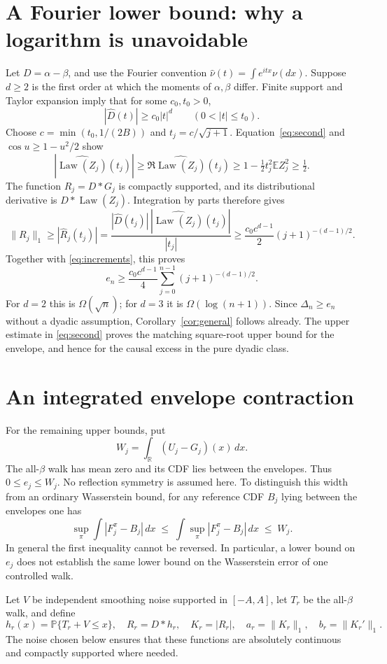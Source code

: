\documentclass[11pt,a4paper]{article}
\numberwithin{equation}{section}
\newcommand{\E}{\mathbb E}
\newcommand{\Prb}{\mathbb P}
\newcommand{\Law}{\operatorname{Law}}
\begin{document}
\section{A Fourier lower bound: why a logarithm is unavoidable}
Let $D=\alpha-\beta$, and use the Fourier convention
$\widehat\nu(t)=\int e^{itx}\nu(dx)$.
Suppose $d\ge2$ is the first order at which the moments of $\alpha,\beta$
differ. Finite support and Taylor expansion imply that for some
$c_0,t_0>0$,
\begin{equation}\label{eq:fourierD}
|\widehat D(t)|\ge c_0|t|^d\qquad(0<|t|\le t_0).
\end{equation}
Choose $c=\min(t_0,1/(2B))$ and $t_j=c/\sqrt{j+1}$.
Equation~\eqref{eq:second} and $\cos u\ge1-u^2/2$ show
\[
|\widehat{\Law(Z_j)}(t_j)|\ge
\Re\widehat{\Law(Z_j)}(t_j)
\ge1-\tfrac12t_j^2\E Z_j^2\ge\tfrac12.
\]
The function $R_j=D*G_j$ is compactly supported, and its distributional
derivative is $D*\Law(Z_j)$. Integration by parts therefore gives
\[
\|R_j\|_1\ge|\widehat R_j(t_j)|
=\frac{|\widehat D(t_j)|\,
|\widehat{\Law(Z_j)}(t_j)|}{|t_j|}
\ge\frac{c_0c^{d-1}}2(j+1)^{-(d-1)/2}.
\]
Together with \eqref{eq:increments}, this proves
\begin{equation}\label{eq:lower}
e_n\ge\frac{c_0c^{d-1}}4
\sum_{j=0}^{n-1}(j+1)^{-(d-1)/2}.
\end{equation}
For $d=2$ this is $\Omega(\sqrt n)$; for $d=3$ it is
$\Omega(\log(n+1))$. Since $\Delta_n\ge e_n$ without a dyadic
assumption, Corollary~\ref{cor:general} follows already.
The upper estimate in \eqref{eq:second} proves the matching square-root
upper bound for the envelope, and hence for the causal excess in the
pure dyadic class.

\section{An integrated envelope contraction}
For the remaining upper bounds, put
\[
W_j=\int_{\mathbb R}(U_j-G_j)(x)\,dx.
\]
The all-$\beta$ walk has mean zero and its CDF lies between the envelopes.
Thus $0\le e_j\le W_j$. No reflection symmetry is assumed here.
To distinguish this width from an ordinary Wasserstein bound, for any
reference CDF $B_j$ lying between the envelopes one has
\[
\sup_\pi\int|F_j^\pi-B_j|\,dx
\;\le\;\int\sup_\pi|F_j^\pi-B_j|\,dx
\;\le\;W_j.
\]
In general the first inequality cannot be reversed. In particular,
a lower bound on $e_j$ does not establish the same lower bound on the
Wasserstein error of one controlled walk.

Let $V$ be independent smoothing noise supported in $[-A,A]$, let $T_r$
be the all-$\beta$ walk, and define
\[
h_r(x)=\Prb\{T_r+V\le x\},\quad
R_r=D*h_r,\quad K_r=|R_r|,\quad
 a_r=\|K_r\|_1,\quad b_r=\|K_r'\|_1.
\]
The noise chosen below ensures that these functions are absolutely
continuous and compactly supported where needed.
\end{document}
